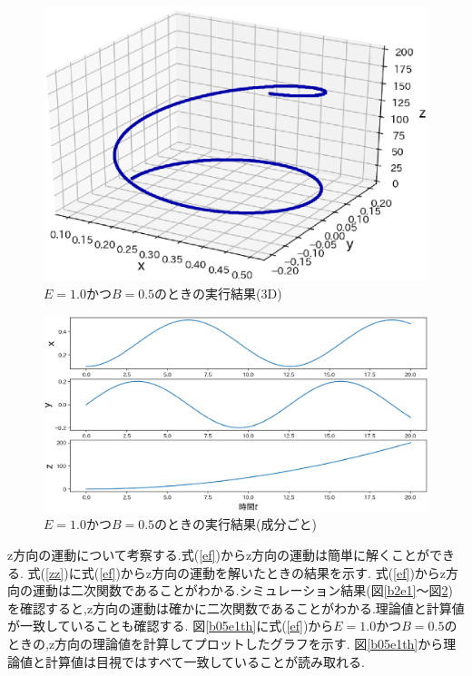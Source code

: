 \documentclass[a4j]{jarticle}
\begin{document}
        \begin{figure}[H]
          \centering
          \includegraphics[scale=0.6]{b05e1.eps}
          \caption{$E=1.0$かつ$B=0.5$のときの実行結果(3D)}
          \label{b05e1}
          \end{figure}

        \begin{figure}[H]
          \centering
          \includegraphics[scale=0.5]{b05e1xyz.eps}
          \caption{$E=1.0$かつ$B=0.5$のときの実行結果(成分ごと)}
          \label{b05e1xyz}
          \end{figure}

          z方向の運動について考察する.式(\ref{ef})からz方向の運動は簡単に解くことができる.
          式(\ref{zz})に式(\ref{ef})からz方向の運動を解いたときの結果を示す.
          式(\ref{ef})からz方向の運動は二次関数であることがわかる.シミュレーション結果(図\ref{b2e1}～図\ref{b05e1xyz})
          を確認すると,z方向の運動は確かに二次関数であることがわかる.理論値と計算値が一致していることも確認する.
          図\ref{b05e1th}に式(\ref{ef})から$E=1.0$かつ$B=0.5$のときの,z方向の理論値を計算してプロットしたグラフを示す.
          図\ref{b05e1th}から理論値と計算値は目視ではすべて一致していることが読み取れる.
\end{document}
